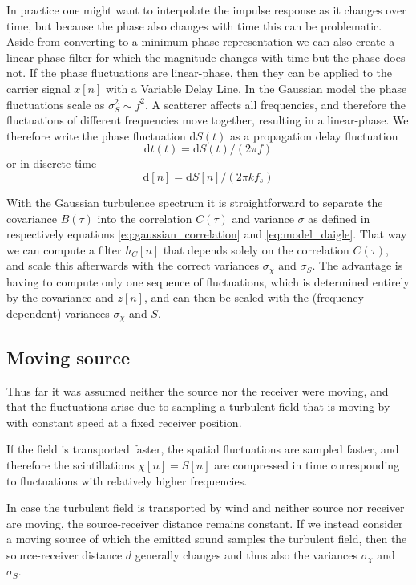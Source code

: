 In practice one might want to interpolate the impulse response as it changes
over time, but because the phase also changes with time this can be problematic.
Aside from converting to a minimum-phase representation we can also create a
linear-phase filter for which the magnitude changes with time but the phase does
not. If the phase fluctuations are linear-phase, then they can be applied to the
carrier signal $x[n]$ with a Variable Delay Line. In the Gaussian model the
phase fluctuations scale as $\sigma_S^2 \sim f^2$. A scatterer affects all frequencies, and therefore the fluctuations of different frequencies move together, resulting in a linear-phase.
We therefore write the phase fluctuation $\mathrm{d}S(t)$ as a propagation delay fluctuation
\begin{equation}\label{eq:time_delay_fluctuations}
\mathrm{d}t(t) = \mathrm{d}S(t) / (2 \pi f)
\end{equation}
or in discrete time
\begin{equation}
 \mathrm{d}[n] = \mathrm{d}S[n] / (2 \pi k f_s)
\end{equation}

With the Gaussian turbulence spectrum it is straightforward to separate the
covariance $B(\tau)$ into the correlation $C(\tau)$ and variance $\sigma$ as defined in respectively equations \eqref{eq:gaussian_correlation} and \eqref{eq:model_daigle}. That
way we can compute a filter $h_C[n]$ that depends solely on the correlation
$C(\tau)$, and scale this afterwards with the correct variances $\sigma_{\chi}$
and $\sigma_{S}$. The advantage is having to compute only one sequence of
fluctuations, which is determined entirely by the covariance and $z[n]$, and can
then be scaled with the (frequency-dependent) variances $\sigma_{\chi}$ and
$S$.

\subsection{Moving source}
Thus far it was assumed neither the source nor the receiver were moving, and
that the fluctuations arise due to sampling a turbulent field that is moving
by with constant speed at a fixed receiver position.

If the field is transported faster, the spatial fluctuations are sampled faster,
and therefore the scintillations $\chi[n]=S[n]$ are compressed in time
corresponding to fluctuations with relatively higher frequencies.

In case the turbulent field is transported by wind and neither source nor
receiver are moving, the source-receiver distance remains constant. If we
instead consider a moving source of which the emitted sound samples the turbulent field, then the
source-receiver distance $d$ generally changes and thus also the variances $\sigma_{\chi}$ and $\sigma_{S}$.

